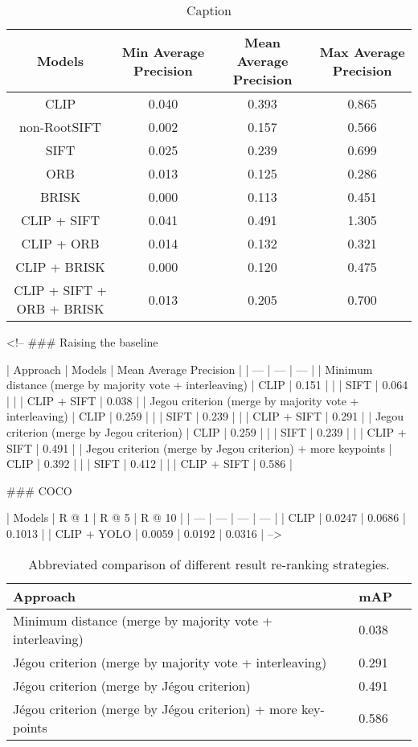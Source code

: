 
\begin{table}[!h]
    \centering
    \caption{Caption}
    \begin{tabular}{c|c|c|c}
 Models & Min Average Precision & Mean Average Precision & Max Average Precision \\\hline
CLIP &  0.040 		 & 0.393 & 0.865 \\
non-RootSIFT &  0.002 		 & 0.157 & 0.566 \\
SIFT &  0.025 		 & 0.239 & 0.699 \\
ORB &  0.013 		 & 0.125 & 0.286 \\
BRISK &  0.000 		 & 0.113 & 0.451 \\
CLIP + SIFT &  0.041 		 & 0.491 & 1.305 \\
CLIP + ORB &  0.014 		 & 0.132 & 0.321 \\
CLIP + BRISK &  0.000 		 & 0.120 & 0.475 \\
CLIP + SIFT + ORB + BRISK &  0.013 		 & 0.205 & 0.700 \\
    \end{tabular}
    \label{tab:my_label}
\end{table}

<!-- 
### Raising the baseline

| Approach | Models | Mean Average Precision |
| --- | --- | --- |
| Minimum distance (merge by majority vote + interleaving) | CLIP |  0.151 |
|   | SIFT | 0.064 |
|   | CLIP + SIFT | 0.038 |
| Jegou criterion (merge by majority vote + interleaving) | CLIP |  0.259 |
|   | SIFT | 0.239 |
|   | CLIP + SIFT | 0.291 |
| Jegou criterion (merge by Jegou criterion) | CLIP |  0.259 |
|   | SIFT | 0.239 |
|   | CLIP + SIFT | 0.491 |
| Jegou criterion (merge by Jegou criterion) + more keypoints | CLIP |  0.392 |
|   | SIFT | 0.412 |
|   | CLIP + SIFT | 0.586 |


### COCO

| Models | R @ 1 | R @ 5 | R @ 10 |
| --- | --- | --- | --- |
| CLIP | 0.0247 | 0.0686 | 0.1013 |
| CLIP + YOLO | 0.0059 | 0.0192 | 0.0316 | -->



\begin{table}[!h]
    \centering
    \caption{Abbreviated comparison of different result re-ranking strategies.}
    \begin{tabular}{|l|l|c|}\hline
        Approach                                                     & mAP \\\hline
        Minimum distance (merge by majority vote + interleaving)     & 0.038                  \\
        Jégou criterion (merge by majority vote + interleaving)      & 0.291                  \\
        Jégou criterion (merge by Jégou criterion)                   & 0.491                  \\
        Jégou criterion (merge by Jégou criterion) + more key-points & 0.586                  \\\hline
    \end{tabular}
    \label{tab:reranking}
\end{table}


